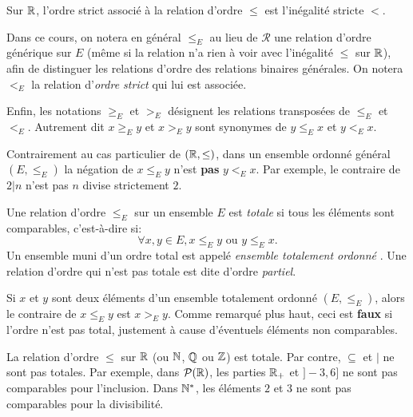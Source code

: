 \begin{exemple}
Sur $\mathbb{R}$, l'ordre strict associé à la relation d'ordre $\leq$ est l'inégalité stricte $<$.
\end{exemple}


Dans ce cours, on notera en général $\leq_E$ au lieu de ${\mathcal R}$ une relation d'ordre générique sur $E$ (même si la relation n'a rien à voir avec l'inégalité $\leq$ sur $\mathbb{R}$), afin de distinguer les relations d'ordre des relations binaires générales. On notera $<_E$ la relation d'\emph{ordre strict} qui lui est associée.

Enfin, les notations $\geq_E$ et $>_E$ désignent les relations transposées de $\leq_E$ et $<_E$. Autrement dit  $x \geq_E y$ et $x >_E y$ sont synonymes de $y \leq_E x$ et $y <_E x$.

\begin{attention}
Contrairement au cas particulier de $(\mathbb{R},\leq)$, dans un ensemble ordonné général $(E,\leq_E)$ la négation de \og $x\leq_E y$\fg{} n'est \textbf{pas} \og $y<_E x$\fg. Par exemple, le contraire de \og$2|n$\fg{} n'est pas \og$n$ divise strictement $2$.\fg{}
\end{attention}

\begin{definition}
Une relation d'ordre $\leq_E$ sur un ensemble $E$ est \emph{totale} si tous les éléments sont comparables, c'est-à-dire si:
\[ \forall x, y\in E, x\leq_Ey\text{ ou } y\leq_E x.\]
Un ensemble muni d'un ordre total est appelé \emph{ensemble totalement ordonné} . Une relation d'ordre qui n'est pas totale est dite d'ordre \emph{partiel}.
\end{definition}

\begin{remarque}
Si $x$ et $y$ sont deux éléments d'un ensemble totalement ordonné $(E,\leq_E)$, alors le contraire de $x\leq_E y$ est $x>_E y$. Comme remarqué plus haut, ceci est \textbf{faux} si l'ordre n'est pas total, justement à cause d'éventuels éléments non comparables. 
\end{remarque}

\begin{exemples}
La relation d'ordre $\leq$ sur $\mathbb{R}$ (ou $\mathbb{N}$, $\mathbb{Q}$ ou  $\mathbb{Z}$) est totale. Par contre, $\subseteq$ et $|$ ne sont pas totales. Par exemple, dans $\mathcal P(\mathbb{R})$, les parties $\mathbb{R}_+$ et $]-3,6]$ ne sont pas comparables pour l'inclusion. Dans $\mathbb{N}^*$, les éléments $2$ et $3$ ne sont pas comparables pour la divisibilité.
\end{exemples}



